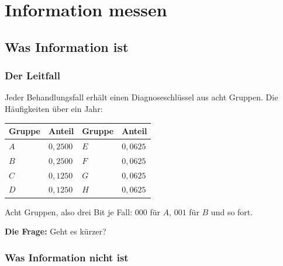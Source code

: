 \part{Information messen}

\chapter{Was Information ist}

\section{Der Leitfall}

\begin{merksatz}
Jeder Behandlungsfall erhält einen Diagnoseschlüssel aus acht Gruppen. Die Häufigkeiten über ein Jahr:

\begin{center}
{\small
\renewcommand{\arraystretch}{1.48}
\begin{tabular}{@{}P{1.6cm}P{1.8cm}P{1.6cm}P{1.8cm}@{}}
\toprule
\textbf{Gruppe} & \textbf{Anteil} & \textbf{Gruppe} & \textbf{Anteil}\\
\midrule
$A$ & $0{,}2500$ & $E$ & $0{,}0625$\\
$B$ & $0{,}2500$ & $F$ & $0{,}0625$\\
$C$ & $0{,}1250$ & $G$ & $0{,}0625$\\
$D$ & $0{,}1250$ & $H$ & $0{,}0625$\\
\bottomrule
\end{tabular}}
\end{center}

Acht Gruppen, also drei Bit je Fall: $000$ für $A$, $001$ für $B$ und so fort.

\textbf{Die Frage:} Geht es kürzer?

\begin{center}
\begin{minipage}{0.88\textwidth}
\end{minipage}
\end{center}
\end{merksatz}

\section{Was Information nicht ist}

